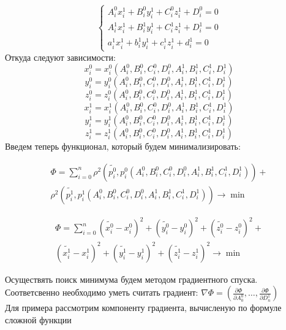 \documentclass[14pt,fleqn,a4paper]{scrartcl}
\begin{document}
\begin{equation}
\label{eq2}
\begin{cases}
A_{i}^{0}x_{i}^{1}+B_{i}^{0}y_{i}^{1}+C_{i}^{0}z_{i}^{1}+D_{i}^{0}=0\\
A_{i}^{1}x_{i}^{1}+B_{i}^{1}y_{i}^{1}+C_{i}^{1}z_{i}^{1}+D_{i}^{1}=0\\
a_{i}^{1}x_{i}^{1}+b_{i}^{1}y_{i}^{1}+c_{i}^{1}z_{i}^{1}+d_{i}^{1}=0 
\end{cases} 
\end{equation}
Откуда следуют зависимости:
$$
x_{i}^{0} = x_{i}^{0}(A_{i}^{0}, B_{i}^{0}, C_{i}^{0}, D_{i}^{0}, A_{i}^{1}, B_{i}^{1}, C_{i}^{1}, D_{i}^{1}) 
$$
$$
y_{i}^{0} = y_{i}^{0}(A_{i}^{0}, B_{i}^{0}, C_{i}^{0}, D_{i}^{0}, A_{i}^{1}, B_{i}^{1}, C_{i}^{1}, D_{i}^{1}) 
$$
$$
z_{i}^{0} = z_{i}^{0}(A_{i}^{0}, B_{i}^{0}, C_{i}^{0}, D_{i}^{0}, A_{i}^{1}, B_{i}^{1}, C_{i}^{1}, D_{i}^{1}) 
$$
$$
x_{i}^{1} = x_{i}^{1}(A_{i}^{0}, B_{i}^{0}, C_{i}^{0}, D_{i}^{0}, A_{i}^{1}, B_{i}^{1}, C_{i}^{1}, D_{i}^{1}) 
$$
$$
y_{i}^{1} = y_{i}^{1}(A_{i}^{0}, B_{i}^{0}, C_{i}^{0}, D_{i}^{0}, A_{i}^{1}, B_{i}^{1}, C_{i}^{1}, D_{i}^{1}) 
$$
$$
z_{i}^{1} = z_{i}^{1}(A_{i}^{0}, B_{i}^{0}, C_{i}^{0}, D_{i}^{0}, A_{i}^{1}, B_{i}^{1}, C_{i}^{1}, D_{i}^{1})
$$ 
Введем теперь функционал, который будем минимализировать:

\begin{multline}
\Phi = \sum \limits_{i=0}^{n} \rho^{2}(\widetilde{p_{i}^{0}},p_{i}^{0}(A_{i}^{0}, B_{i}^{0}, C_{i}^{0}, D_{i}^{0}, A_{i}^{1}, B_{i}^{1}, C_{i}^{1}, D_{i}^{1}))+ \\
\rho^{2}(\widetilde{p_{i}^{1}},p_{i}^{1}(A_{i}^{0}, B_{i}^{0}, C_{i}^{0}, D_{i}^{0}, A_{i}^{1}, B_{i}^{1}, C_{i}^{1}, D_{i}^{1}))
\rightarrow \min
\end{multline}

\begin{multline}
\Phi = \sum \limits_{i=0}^{n} 
(\widetilde{x_{i}^{0}}-x_{i}^{0})^{2}+
(\widetilde{y_{i}^{0}}-y_{i}^{0})^{2}+
(\widetilde{z_{i}^{0}}-z_{i}^{0})^{2}+\\
(\widetilde{x_{i}^{1}}-x_{i}^{1})^{2}+
(\widetilde{y_{i}^{1}}-y_{i}^{1})^{2}+
(\widetilde{z_{i}^{1}}-z_{i}^{1})^{2} \rightarrow \min
\end{multline}


Осуществять поиск минимума будем методом градиентного спуска. Соответсвенно необходимо уметь считать градиент: $\nabla \Phi = (\frac{\partial \Phi}{\partial A_{0}^{0}}, \hdots, \frac{\partial \Phi}{\partial D_{n}^{1}})$ \\
Для примера рассмотрим компоненту градиента, вычисленую по формуле сложной функции 
\end{document}
